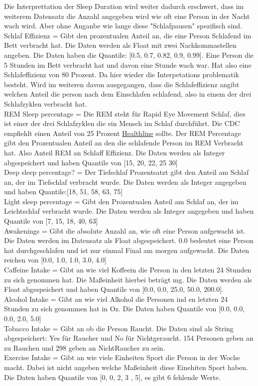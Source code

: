 \documentclass[usegeometry=true]{scrartcl}
\begin{document}
{Die Interprettation der Sleep Duration wird weiter dadurch erschwert, dass im weiterem Datensatz die Anzahl angegeben wird wie oft eine Person in der Nacht wach wird. Aber ohne Anganbe wie lange diese "Schlafpausen" spezifisch sind. 
\\ Schlaf Effizienz = Gibt den prozentualen Anteil an, die eine Person Schlafend im Bett verbracht hat. Die Daten werden als Float mit zwei Nachkommastellen angeben. Die Daten haben die Quantile: [0.5, 0.7, 0.82, 0.9, 0.99]. Eine Person die 5 Stunden im Bett verbracht hat und davon eine Stunde wach war. Hat also eine Schlafeffizienz von 80 Prozent. Da hier wieder die Interpetations problematik besteht. Wird im weiteren davon ausgegangen, dass die Schlafeffizienz angibt welchen Anteil die person nach dem Einschlafen schlafend, also in einem der drei Schlafzyklen verbracht hat.
\\ REM Sleep percentage = Die REM steht für Rapid Eye Movement Schlaf, dies ist einer der drei Schlafzyklen die ein Mensch im Schlaf durchführt. Die CDC empfiehlt einen Anteil von 25 Prozent  \href{https://www.healthline.com/health/how-much-deep-sleep-do-you-need}{Healthline} sollte.  Der REM Percentage gibt den Prozentualen Anteil an den die schlafende Person im REM Verbracht hat. Also Anteil REM an Schlaff Effizienz. Die Daten werden als Integer abgespeichert und haben Quantile von [15, 20, 22, 25 30]
\\ Deep sleep percentage? = Der Tiefschlaf Prozentsatzt gibt den  Anteil am Schlaf an, der im Tiefschlaf verbracht wurde. Die Daten werden als Integer angegeben und haben Quantile:[18, 51, 58, 63, 75] 
\\ Light sleep percentage = Gibt den Prozentualen Anteil am Schlaf an, der im Leichtschlaf verbracht wurde. Die Daten werden als Integer angegeben und haben Quantile von [7, 15, 18, 40, 63]
\\ Awakenings = Gibt die absolute Anzahl an, wie oft eine Person aufgewacht ist. Die Daten werden im Datensatz als Float abgespeichert. 0.0 bedeutet eine Person hat durchgeschlafen und ist nur einmal Final am morgen aufgewacht. Die Daten reichen von  [0.0, 1.0, 1.0, 3.0, 4.0]
\\ Caffeine Intake = Gibt an wie viel Koffeein die Person in den letzten 24 Stunden zu sich genommen hat. Die Maßeinheit hierbei beträgt mg. Die Daten werden als Float abgespeichert und haben Quantile von  [0.0, 0.0, 25.0, 50.0, 200.0].
\\ Alcohol Intake = Gibt an wie viel Alkohol die Personen ind en letzten 24 Stunden zu sich genommen hat in Oz. Die Daten haben Quantile von [0.0, 0.0, 0.0, 2.0, 5.0]
\\ Tobacco Intake = Gibt an ob die Person Raucht. Die Daten sind als String abgespeichert: Yes für Raucher und No für Nichtgeraucht. 154 Personen geben an zu Rauchen und 298 geben an NichtRaucher zu sein. 
\\ Exercise Intake = Gibt an wie viele Einheiten Sport die Person in der Woche macht. Dabei ist nicht angeben welche Maßeinheit diese Einehiten Sport haben.  Die Daten haben Quantile von [0, 0, 2, 3 , 5], es gibt 6 fehlende Werte.     \\ }\\
\end{document}
